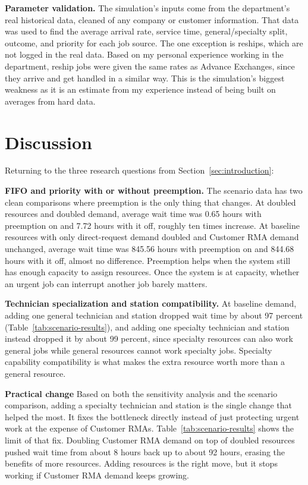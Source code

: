 \documentclass[12pt, letterpaper, twoside]{article}
\begin{document}
\textbf{Parameter validation.} The simulation's inputs come from the department's real
historical data, cleaned of any company or customer information. That data was used to
find the average arrival rate, service time, general/specialty split, outcome, and
priority for each job source. The one exception is reships, which are not logged in the
real data. Based on my personal experience working in the department, reship jobs were
given the same rates as Advance Exchanges, since they arrive and get handled in a
similar way. This is the simulation's biggest weakness as it is an estimate from my experience instead of being built
on averages from hard data.

\section{Discussion}
\label{sec:discussion}

Returning to the three research questions from Section~\ref{sec:introduction}:

\textbf{FIFO and priority with or without preemption.} The scenario data has two clean
comparisons where preemption is the only thing that changes. At doubled resources and
doubled demand, average wait time was 0.65 hours with preemption on and 7.72 hours with
it off, roughly ten times increase. At baseline resources with only direct-request demand
doubled and Customer RMA demand unchanged, average wait time was 845.56 hours with
preemption on and 844.68 hours with it off, almost no difference. Preemption helps
when the system still has enough capacity to assign resources. Once
the system is at capacity, whether an urgent job can interrupt another job barely
matters.

\textbf{Technician specialization and station compatibility.} At baseline demand, adding one general technician and station
dropped wait time by about 97 percent (Table~\ref{tab:scenario-results}), and adding one
specialty technician and station instead dropped it by about 99 percent, since specialty
resources can also work general jobs while general resources cannot work specialty jobs.
Specialty capability compatibility is what makes the extra resource worth more than
a general resource.

\textbf{Practical change} Based on both the
sensitivity analysis and the scenario comparison, adding a specialty technician and
station is the single change that helped the most. It fixes the bottleneck directly
instead of just protecting urgent work at the expense of Customer RMAs.
Table~\ref{tab:scenario-results} shows the limit of that fix.
Doubling Customer RMA demand on top of doubled resources pushed wait time from about 8
hours back up to about 92 hours, erasing the benefits of more resources. Adding resources is the
right move, but it stops working if Customer RMA demand keeps growing.
\end{document}
